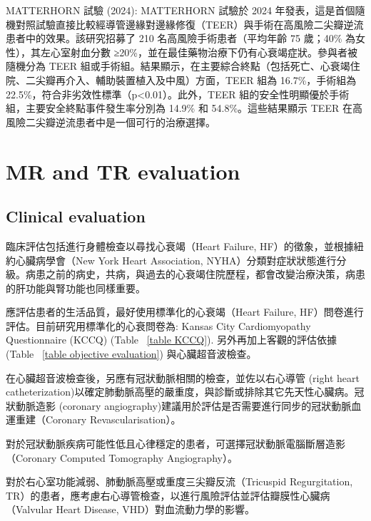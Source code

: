 \documentclass[nols]{tufte-book}
\begin{document}
MATTERHORN 試驗 (2024): MATTERHORN 試驗於 2024 年發表，這是首個隨機對照試驗直接比較經導管邊緣對邊緣修復（TEER）與手術在高風險二尖瓣逆流患者中的效果。該研究招募了 210 名高風險手術患者（平均年齡 75 歲；40\% 為女性），其左心室射血分數 ≥20\%，並在最佳藥物治療下仍有心衰竭症狀。參與者被隨機分為 TEER 組或手術組。結果顯示，在主要綜合終點（包括死亡、心衰竭住院、二尖瓣再介入、輔助裝置植入及中風）方面，TEER 組為 16.7\%，手術組為 22.5\%，符合非劣效性標準（p<0.01）。此外，TEER 組的安全性明顯優於手術組，主要安全終點事件發生率分別為 14.9\% 和 54.8\%。這些結果顯示 TEER 在高風險二尖瓣逆流患者中是一個可行的治療選擇。\cite{Baldus2024}

\section{MR and TR evaluation}



\subsection{Clinical evaluation}

臨床評估包括進行身體檢查以尋找心衰竭（Heart Failure, HF）的徵象，並根據紐約心臟病學會（New York Heart Association, NYHA）分類對症狀狀態進行分級。病患之前的病史，共病，與過去的心衰竭住院歷程，都會改變治療決策，病患的肝功能與腎功能也同樣重要。\cite{Tachibana2023}

應評估患者的生活品質，最好使用標準化的心衰竭（Heart Failure, HF）問卷進行評估。目前研究用標準化的心衰問卷為: Kansas City Cardiomyopathy Questionnaire (KCCQ) (Table ~\ref{table KCCQ}). 另外再加上客觀的評估依據 (Table ~\ref{table objective evaluation}) 與心臟超音波檢查。

在心臟超音波檢查後，另應有冠狀動脈相關的檢查，並佐以右心導管 (right heart catheterization)以確定肺動脈高壓的嚴重度，與診斷或排除其它先天性心臟病。冠狀動脈造影 (coronary angiography)建議用於評估是否需要進行同步的冠狀動脈血運重建（Coronary Revascularisation）。\cite{Sanchis2023, Grayburn2021}

對於冠狀動脈疾病可能性低且心律穩定的患者，可選擇冠狀動脈電腦斷層造影（Coronary Computed Tomography Angiography）。

對於右心室功能減弱、肺動脈高壓或重度三尖瓣反流（Tricuspid Regurgitation, TR）的患者，應考慮右心導管檢查，以進行風險評估並評估瓣膜性心臟病（Valvular Heart Disease, VHD）對血流動力學的影響。
\end{document}
